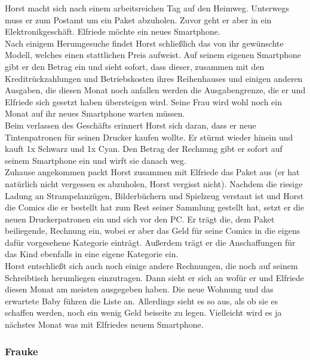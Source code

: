 Horst macht sich nach einem arbeitsreichen Tag auf den Heimweg. Unterwegs muss er zum
Postamt um ein Paket abzuholen. Zuvor geht er aber in ein Elektronikgesch\"aft.
Elfriede m\"ochte ein neues Smartphone.\\

Nach einigem Herumgesuche findet Horst schlie\ss lich das von ihr gew\"unschte
Modell, welches einen stattlichen Preis aufweist. Auf seinem eigenen
Smartphone gibt er den Betrag ein und sieht sofort, dass dieser, zusammen
mit den Kreditr\"uckzahlungen und Betriebskosten ihres Reihenhauses und
einigen anderen Ausgaben, die diesen Monat noch anfallen werden die
Ausgabengrenze, die er und Elfriede sich gesetzt haben \"ubersteigen wird.
Seine Frau wird wohl noch ein Monat auf ihr neues Smartphone warten
m\"ussen.\\

Beim verlassen des Gesch\"afts erinnert Horst sich daran, dass er neue
Tintenpatronen für seinen Drucker kaufen wollte. Er st\"urmt wieder hinein
und kauft 1x Schwarz und 1x Cyan. Den Betrag der Rechnung gibt er sofort
auf seinem Smartphone ein und wirft sie danach weg.\\

Zuhause angekommen packt Horst zusammen mit Elfriede das Paket aus (er hat
nat\"urlich nicht vergessen es abzuholen, Horst vergisst nicht). Nachdem die
riesige Ladung an Strampelanz\"ugen, Bilderb\"uchern und Spielzeug verstaut
ist und Horst die Comics die er bestellt hat zum Rest seiner Sammlung
gestellt hat, setzt er die neuen Druckerpatronen ein und sich vor den PC.
Er tr\"agt die, dem Paket beiliegende, Rechnung ein, wobei er aber das Geld
für seine Comics in die eigens daf\"ur vorgesehene Kategorie eintr\"agt.
Au\ss erdem tr\"agt er die Anschaffungen für das Kind ebenfalls in eine eigene
Kategorie ein.\\

Horst entschlie\ss t sich auch noch einige andere Rechnungen, die noch auf
seinem Schreibtisch herumliegen einzutragen. Dann sieht er sich an wof\"ur er
und Elfriede diesen Monat am meisten ausgegeben haben. Die neue Wohnung und
das erwartete Baby f\"uhren die Liste an. Allerdings sieht es so aus, als ob
sie es schaffen werden, noch ein wenig Geld beiseite zu legen. Vielleicht
wird es ja n\"achstes Monat was mit Elfriedes neuem Smartphone.\\

\subsubsection{Frauke}

